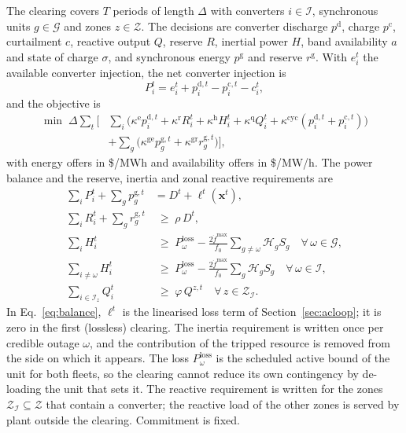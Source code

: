 The clearing covers $T$ periods of length $\Delta$ with converters $i \in
\mathcal{I}$, synchronous units $g \in \mathcal{G}$ and zones $z \in
\mathcal{Z}$. The decisions are converter discharge $p^{\mathrm{d}}$, charge
$p^{\mathrm{c}}$, curtailment $c$, reactive output $Q$, reserve $R$, inertial
power $H$, band availability $a$ and state of charge $\sigma$, and
synchronous energy $p^{\mathrm{g}}$ and reserve $r^{\mathrm{g}}$. With
$e_i^t$ the available converter injection, the net converter injection is
%
\begin{equation}
  P_i^t = e_i^t + p^{\mathrm{d},t}_i - p^{\mathrm{c},t}_i - c_i^t ,
  \label{eq:injection}
\end{equation}
%
and the objective is
%
\begin{align}
  \min \; \Delta \sum_t \Big[ & \sum_i \big( \kappa^{\mathrm{e}}
      p^{\mathrm{d},t}_i + \kappa^{\mathrm{r}} R_i^t
      + \kappa^{\mathrm{h}} H_i^t + \kappa^{\mathrm{q}} Q_i^t
      + \kappa^{\mathrm{cyc}} ( p^{\mathrm{d},t}_i + p^{\mathrm{c},t}_i )
      \big) \nonumber \\
  & + \sum_g \big( \kappa^{\mathrm{ge}} p^{\mathrm{g},t}_g
    + \kappa^{\mathrm{gr}} r^{\mathrm{g},t}_g \big) \Big] ,
  \label{eq:objective}
\end{align}
%
with energy offers in \$/MWh and availability offers in \$/MW/h. The power
balance and the reserve, inertia and zonal reactive requirements are
%
\begin{align}
  \sum_i P_i^t + \sum_g p^{\mathrm{g},t}_g
    &= D^t + \ell^t(\mathbf{x}^t) ,
  \label{eq:balance} \\
  \sum_i R_i^t + \sum_g r_g^{\mathrm{g},t} &\;\ge\; \rho \, D^t ,
  \label{eq:reserve} \\
  \sum_{i} H_i^t &\;\ge\; P^{\mathrm{loss}}_{\omega}
    - \tfrac{2\dot{f}^{\max}}{f_0}
      \textstyle\sum_{g \ne \omega} \mathcal{H}_g S_g
    \quad \forall\, \omega \in \mathcal{G} , \label{eq:inertia} \\
  \sum_{i \ne \omega} H_i^t &\;\ge\; P^{\mathrm{loss}}_{\omega}
    - \tfrac{2\dot{f}^{\max}}{f_0}
      \textstyle\sum_{g} \mathcal{H}_g S_g
    \quad \forall\, \omega \in \mathcal{I} , \label{eq:inertia-conv} \\
  \sum_{i \in \mathcal{I}_z} Q_i^t &\;\ge\; \varphi \, Q^{z,t}
    \quad \forall\, z \in \mathcal{Z}_{\mathcal{I}} .
  \label{eq:reactive}
\end{align}
%
In Eq.~\eqref{eq:balance}, $\ell^t$ is the linearised loss term of
Section~\ref{sec:acloop}; it is zero in the first (lossless) clearing. The
inertia requirement is written once per credible outage $\omega$, and the
contribution of the tripped resource is removed from the side on which it
appears. The loss $P^{\mathrm{loss}}_\omega$ is the scheduled active bound of
the unit for both fleets, so the clearing cannot reduce its own contingency
by de-loading the unit that sets it. The reactive requirement is written
for the zones $\mathcal{Z}_{\mathcal{I}} \subseteq \mathcal{Z}$ that
contain a converter; the reactive load of the other zones is served by plant
outside the clearing. Commitment is fixed.

